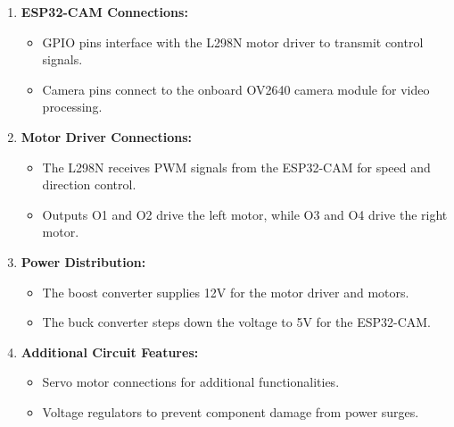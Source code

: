 \documentclass[12pt,a4paper]{report}
\begin{document}
\begin{enumerate}
    \item \textbf{ESP32-CAM Connections:}
    \begin{itemize}
        \item GPIO pins interface with the L298N motor driver to transmit control signals.
        \item Camera pins connect to the onboard OV2640 camera module for video processing.
    \end{itemize}
    
    \item \textbf{Motor Driver Connections:}
    \begin{itemize}
        \item The L298N receives PWM signals from the ESP32-CAM for speed and direction control.
        \item Outputs O1 and O2 drive the left motor, while O3 and O4 drive the right motor.
    \end{itemize}
    
    \item \textbf{Power Distribution:}
    \begin{itemize}
        \item The boost converter supplies 12V for the motor driver and motors.
        \item The buck converter steps down the voltage to 5V for the ESP32-CAM.
    \end{itemize}
    
    \item \textbf{Additional Circuit Features:}
    \begin{itemize}
        \item Servo motor connections for additional functionalities.
        \item Voltage regulators to prevent component damage from power surges.
    \end{itemize}



\end{enumerate}
\end{document}
